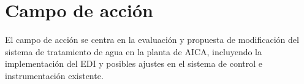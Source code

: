 \section{Campo de acción}
El campo de acción se centra en la evaluación y propuesta de modificación del sistema de tratamiento de agua en la planta de AICA, incluyendo la implementación del EDI y posibles ajustes en el sistema de control e instrumentación existente.\\